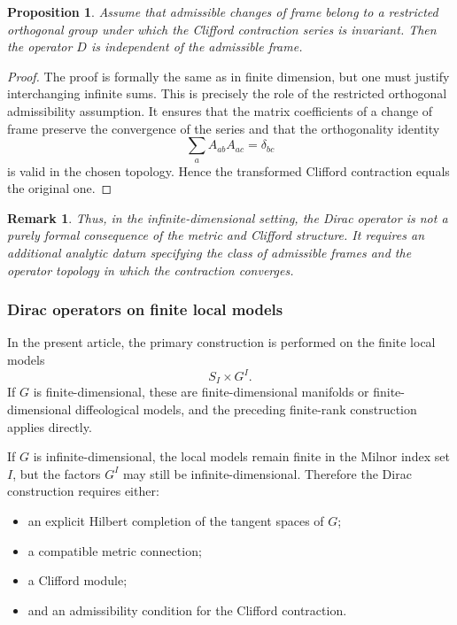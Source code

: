 \documentclass[11pt]{amsart}
\newtheorem{proposition}[theorem]{Proposition}
\newtheorem{remark}[theorem]{Remark}
\begin{document}
\begin{proposition}
Assume that admissible changes of frame belong to a restricted orthogonal group
under which the Clifford contraction series is invariant. Then the operator
\(D\) is independent of the admissible frame.
\end{proposition}

\begin{proof}
The proof is formally the same as in finite dimension, but one must justify
interchanging infinite sums. This is precisely the role of the restricted
orthogonal admissibility assumption. It ensures that the matrix coefficients
of a change of frame preserve the convergence of the series and that the
orthogonality identity
\[
\sum_a A_{ab}A_{ac}=\delta_{bc}
\]
is valid in the chosen topology. Hence the transformed Clifford contraction
equals the original one.
\end{proof}

\begin{remark}
Thus, in the infinite-dimensional setting, the Dirac operator is not a purely
formal consequence of the metric and Clifford structure. It requires an
additional analytic datum specifying the class of admissible frames and the
operator topology in which the contraction converges.
\end{remark}

\subsubsection{Dirac operators on finite local models}

In the present article, the primary construction is performed on the finite
local models
\[
S_I\times G^I.
\]
If \(G\) is finite-dimensional, these are finite-dimensional manifolds or
finite-dimensional diffeological models, and the preceding finite-rank
construction applies directly.

If \(G\) is infinite-dimensional, the local models remain finite in the Milnor
index set \(I\), but the factors \(G^I\) may still be infinite-dimensional.
Therefore the Dirac construction requires either:
\begin{itemize}
\item an explicit Hilbert completion of the tangent spaces of \(G\);
\item a compatible metric connection;
\item a Clifford module;
\item and an admissibility condition for the Clifford contraction.
\end{itemize}
\end{document}

